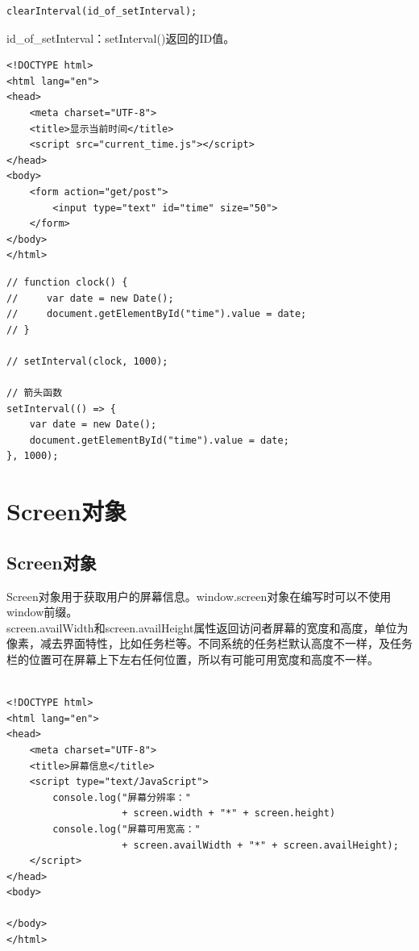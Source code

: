 \begin{lstlisting}[style=htmlcssjs]
clearInterval(id_of_setInterval);
\end{lstlisting}

id\_of\_setInterval：setInterval()返回的ID值。\\


\begin{lstlisting}[style=htmlcssjs, title=current\_time.html]
<!DOCTYPE html>
<html lang="en">
<head>
    <meta charset="UTF-8">
    <title>显示当前时间</title>
    <script src="current_time.js"></script>
</head>
<body>
    <form action="get/post">
        <input type="text" id="time" size="50">
    </form>
</body>
</html>
\end{lstlisting}

\begin{lstlisting}[style=htmlcssjs, title=current\_time.js]
// function clock() {
//     var date = new Date();
//     document.getElementById("time").value = date;
// }

// setInterval(clock, 1000);

// 箭头函数
setInterval(() => {
    var date = new Date();
    document.getElementById("time").value = date;
}, 1000);
\end{lstlisting}

\newpage

\section{Screen对象}

\subsection{Screen对象}

Screen对象用于获取用户的屏幕信息。window.screen对象在编写时可以不使用window前缀。\\

screen.availWidth和screen.availHeight属性返回访问者屏幕的宽度和高度，单位为像素，减去界面特性，比如任务栏等。不同系统的任务栏默认高度不一样，及任务栏的位置可在屏幕上下左右任何位置，所以有可能可用宽度和高度不一样。\\

\\

\begin{lstlisting}[style=htmlcssjs]
<!DOCTYPE html>
<html lang="en">
<head>
    <meta charset="UTF-8">
    <title>屏幕信息</title>
    <script type="text/JavaScript">
        console.log("屏幕分辨率："
					+ screen.width + "*" + screen.height)
        console.log("屏幕可用宽高："
					+ screen.availWidth + "*" + screen.availHeight);
    </script>
</head>
<body>

</body>
</html>
\end{lstlisting}

